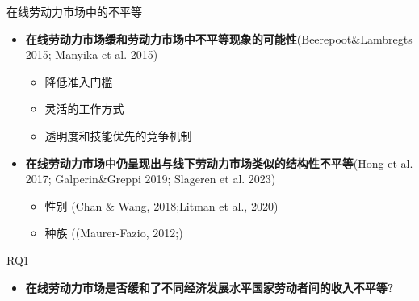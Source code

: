 \documentclass{beamer}
\begin{document}
    \begin{frame}{在线劳动力市场中的不平等}{\secname}
    \begin{itemize}
    \pause
        \item \textbf{在线劳动力市场缓和劳动力市场中不平等现象的可能性}(Beerepoot\&Lambregts 2015; Manyika et al. 2015)
        \begin{itemize}
            \item 降低准入门槛
            \item 灵活的工作方式
            \item 透明度和技能优先的竞争机制
        \end{itemize}
        \pause
        \item \textbf{在线劳动力市场中仍呈现出与线下劳动力市场类似的结构性不平等}(Hong et al. 2017; Galperin\&Greppi 2019; Slageren et al. 2023)
        \begin{itemize}
            \item 性别 (Chan \& Wang, 2018;Litman et al., 2020)
            \item 种族 ((Maurer-Fazio, 2012;)
        \end{itemize}
    \end{itemize}
    \pause
    \begin{block}{RQ1}
        \begin{itemize}
            \item \textbf{在线劳动力市场是否缓和了不同经济发展水平国家劳动者间的收入不平等?}
        \end{itemize}
    \end{block}
    \end{frame}
    
\end{document}
